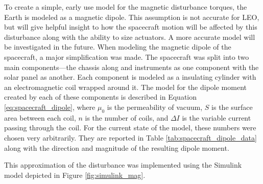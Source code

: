 To create a simple, early use model for the magnetic disturbance torques, the Earth is modeled as a magnetic dipole. This assumption is not accurate for LEO, but will give helpful insight to how the spacecraft motion will be affected by this disturbance along with the ability to size actuators. A more accurate model will be investigated in the future. 
When modeling the magnetic dipole of the spacecraft, a major simplification was made. The spacecraft was split into two main components---the chassis along and instruments as one component with the solar panel as another. Each component is modeled as a insulating cylinder with an electromagnetic coil wrapped around it. The model for the dipole moment created by each of these components is described in Equation \ref{eq:spacecraft_dipole}, where $\mu_0$ is the permeability of vacuum, $S$ is the surface area between each coil, $n$ is the number of coils, and $\Delta I$ is the variable current passing through the coil. For the current state of the model, these numbers were chosen very arbitrarily. They are reported in Table \ref{tab:spacecraft_dipole_data} along with the direction and magnitude of the resulting dipole moment.

This approximation of the disturbance was implemented using the Simulink model depicted in Figure \ref{fig:simulink_mag}.